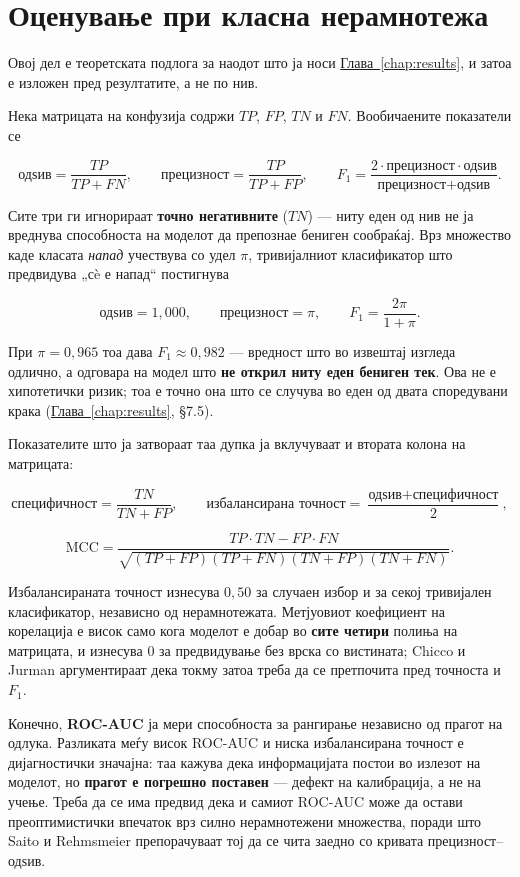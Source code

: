 \section{Оценување при класна нерамнотежа}

Овој дел е теоретската подлога за наодот што ја носи \hyperref[chap:results]{Глава~\ref*{chap:results}}, и затоа е изложен пред
резултатите, а не по нив.

Нека матрицата на конфузија содржи $TP$, $FP$, $TN$ и $FN$. Вообичаените показатели се

\[
\text{одѕив} = \frac{TP}{TP + FN}, \qquad
\text{прецизност} = \frac{TP}{TP + FP}, \qquad
F_1 = \frac{2 \cdot \text{прецизност} \cdot \text{одѕив}}{\text{прецизност} + \text{одѕив}} .
\]

Сите три ги игнорираат \textbf{точно негативните} ($TN$) --- ниту еден од нив не ја вреднува
способноста на моделот да препознае бениген сообраќај. Врз множество каде класата
\emph{напад} учествува со удел $\pi$, тривијалниот класификатор што предвидува „сè е напад“
постигнува

\[
\text{одѕив} = 1{,}000, \qquad \text{прецизност} = \pi, \qquad F_1 = \frac{2\pi}{1 + \pi}.
\]

При $\pi = 0{,}965$ тоа дава $F_1 \approx 0{,}982$ --- вредност што во извештај изгледа
одлично, а одговара на модел што \textbf{не открил ниту еден бениген тек}. Ова не е хипотетички
ризик; тоа е точно она што се случува во еден од двата споредувани крака
(\hyperref[chap:results]{Глава~\ref*{chap:results}}, §7.5).

Показателите што ја затвораат таа дупка ја вклучуваат и втората колона на матрицата:

\[
\text{специфичност} = \frac{TN}{TN + FP}, \qquad
\text{избалансирана точност} = \frac{\text{одѕив} + \text{специфичност}}{2},
\]

\[
\mathrm{MCC} = \frac{TP \cdot TN - FP \cdot FN}
{\sqrt{(TP{+}FP)(TP{+}FN)(TN{+}FP)(TN{+}FN)}} .
\]

Избалансираната точност изнесува $0{,}50$ за случаен избор и за секој тривијален
класификатор, независно од нерамнотежата. Метјуовиот коефициент на корелација
\cite{chicco2020mcc} е висок само кога моделот е добар во \textbf{сите четири} полиња на
матрицата, и изнесува $0$ за предвидување без врска со вистината; Chicco и Jurman
аргументираат дека токму затоа треба да се претпочита пред точноста и $F_1$.

Конечно, \textbf{ROC-AUC} ја мери способноста за рангирање независно од прагот на одлука. Разликата
меѓу висок ROC-AUC и ниска избалансирана точност е дијагностички значајна: таа кажува дека
информацијата постои во излезот на моделот, но \textbf{прагот е погрешно поставен} --- дефект на
калибрација, а не на учење. Треба да се има предвид дека и самиот ROC-AUC може да остави
преоптимистички впечаток врз силно нерамнотежени множества, поради што Saito и Rehmsmeier
\cite{saito2015prc} препорачуваат тој да се чита заедно со кривата прецизност–одѕив.

